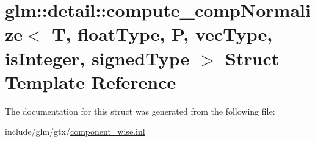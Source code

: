 \hypertarget{structglm_1_1detail_1_1compute__compNormalize}{}\section{glm\+:\+:detail\+:\+:compute\+\_\+comp\+Normalize$<$ T, float\+Type, P, vec\+Type, is\+Integer, signed\+Type $>$ Struct Template Reference}
\label{structglm_1_1detail_1_1compute__compNormalize}


The documentation for this struct was generated from the following file\+:\begin{DoxyCompactItemize}
\item 
include/glm/gtx/\hyperlink{component__wise_8inl}{component\+\_\+wise.\+inl}\end{DoxyCompactItemize}
